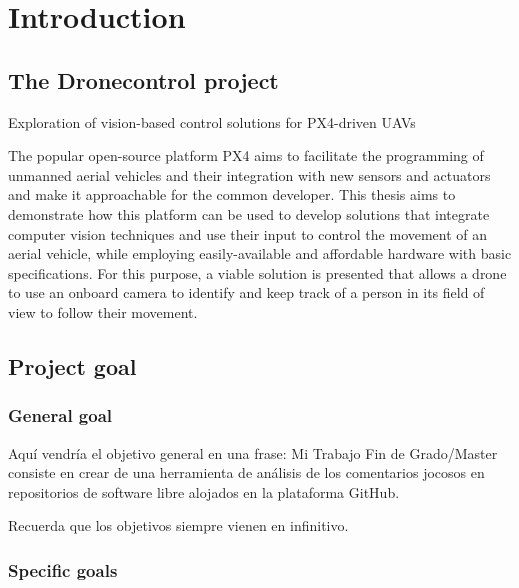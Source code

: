 \cleardoublepage
\chapter{Introduction}
\label{sec:intro}

\section{The Dronecontrol project}
Exploration of vision-based control solutions for PX4-driven UAVs

The popular open-source platform PX4 aims to facilitate the programming of unmanned aerial vehicles and their integration with new sensors and actuators and make it approachable for the common developer. This thesis aims to demonstrate how this platform can be used to develop solutions that integrate computer vision techniques and use their input to control the movement of an aerial vehicle, while employing easily-available and affordable hardware with basic specifications. For this purpose, a viable solution is presented that allows a drone to use an onboard camera to identify and keep track of a person in its field of view to follow their movement.




\section{Project goal}
\label{sec:objetivos}

\subsection{General goal} %
\label{sec:objetivo-general} %


Aquí vendría el objetivo general en una frase:
Mi Trabajo Fin de Grado/Master consiste en crear de una herramienta de análisis de los comentarios jocosos en repositorios de software libre alojados en la plataforma GitHub.

Recuerda que los objetivos siempre vienen en infinitivo.


\subsection{Specific goals}
\label{sec:objetivos-especificos}

